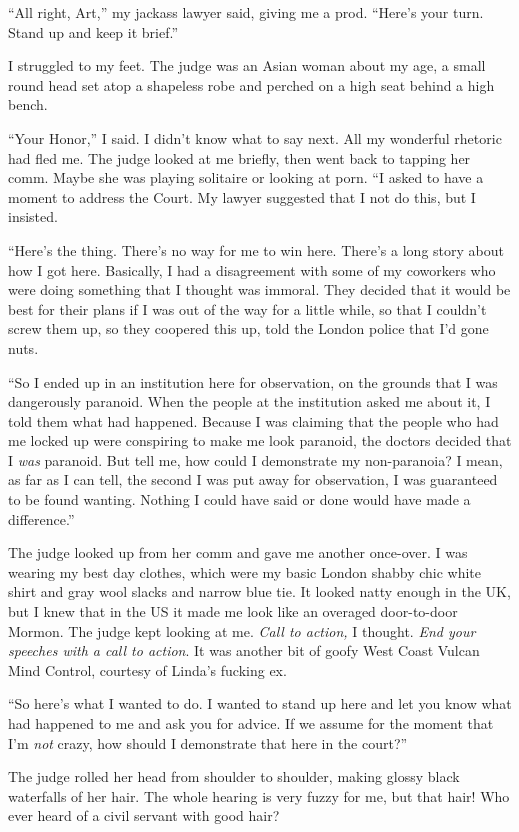 “All right, Art,” my jackass lawyer said, giving me a prod. “Here’s
your turn. Stand up and keep it brief.”

I struggled to my feet. The judge was an Asian woman about my age,
a small round head set atop a shapeless robe and perched on a high
seat behind a high bench.

“Your Honor,” I said. I didn’t know what to say next. All my
wonderful rhetoric had fled me. The judge looked at me briefly,
then went back to tapping her comm. Maybe she was playing solitaire
or looking at porn. “I asked to have a moment to address the Court.
My lawyer suggested that I not do this, but I insisted.

“Here’s the thing. There’s no way for me to win here. There’s a
long story about how I got here. Basically, I had a disagreement
with some of my coworkers who were doing something that I thought
was immoral. They decided that it would be best for their plans if
I was out of the way for a little while, so that I couldn’t screw
them up, so they coopered this up, told the London police that I’d
gone nuts.

“So I ended up in an institution here for observation, on the
grounds that I was dangerously paranoid. When the people at the
institution asked me about it, I told them what had happened.
Because I was claiming that the people who had me locked up were
conspiring to make me look paranoid, the doctors decided that I
\emph{was} paranoid. But tell me, how could I demonstrate my
non-paranoia? I mean, as far as I can tell, the second I was put
away for observation, I was guaranteed to be found wanting. Nothing
I could have said or done would have made a difference.”

The judge looked up from her comm and gave me another once-over. I
was wearing my best day clothes, which were my basic London shabby
chic white shirt and gray wool slacks and narrow blue tie. It
looked natty enough in the UK, but I knew that in the US it made me
look like an overaged door-to-door Mormon. The judge kept looking
at me. \emph{Call to action,} I thought.
\emph{End your speeches with a call to action}. It was another bit
of goofy West Coast Vulcan Mind Control, courtesy of Linda’s
fucking ex.

“So here’s what I wanted to do. I wanted to stand up here and let
you know what had happened to me and ask you for advice. If we
assume for the moment that I’m \emph{not} crazy, how should I
demonstrate that here in the court?”

The judge rolled her head from shoulder to shoulder, making glossy
black waterfalls of her hair. The whole hearing is very fuzzy for
me, but that hair! Who ever heard of a civil servant with good
hair?

